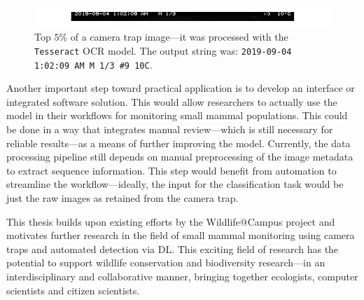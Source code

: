 \begin{figure}[ht]
\centering
\includegraphics{figures/ocr_example.pdf}
\caption{Top \(5\%\) of a camera trap image---it was processed with the \texttt{Tesseract} \acs{OCR} model. The output string was: \texttt{2019-09-04 1:02:09 AM M 1/3 \#9 10\textdegree C}.}
\label{fig:ocr_sample}
\end{figure}

Another important step toward practical application is to develop an interface or integrated software solution.
This would allow researchers to actually use the model in their workflows for monitoring small mammal populations.
This could be done in a way that integrates manual review---which is still necessary for reliable results---as a means of further improving the model.
Currently, the data processing pipeline still depends on manual preprocessing of the image metadata to extract sequence information.
This step would benefit from automation to streamline the workflow---ideally, the input for the classification task would be just the raw images as retained from the camera trap.

This thesis builds upon existing efforts by the Wildlife@Campus project and motivates further research in the field of small mammal monitoring using camera traps and automated detection via \ac{DL}.
This exciting field of research has the potential to support wildlife conservation and biodiversity research---in an interdisciplinary and collaborative manner, bringing together ecologists, computer scientists and citizen scientists.
